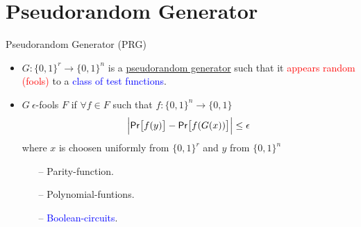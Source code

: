 \documentclass[xcolor={table,dvipsnames,usenames}]{beamer}
\begin{document}
\section{Pseudorandom Generator}
\begin{frame}{Pseudorandom Generator (PRG)}
\begin{itemize}
	\item $G: \{0,1\}^r \rightarrow \{0,1\}^n$ is a {\underline{pseudorandom generator}} such that it \textcolor{red}{appears random (fools)} to a \textcolor{blue}{class of test functions}.
	\pause
	\item $G~\epsilon$-fools $F$ if $\forall f \in F$ such that $f: \{0,1\}^n \rightarrow \{0,1\}$
	$$\Big|\mathsf{Pr}\big[f(y)\big] -  \mathsf{Pr}\big[f(G(x))\big]\Big| \leq \epsilon$$
	where $x$ is choosen uniformly from $\{0,1\}^r$ and $y$ from $\{0,1\}^n$
	\pause
	\begin{itemize}
		\item[--] Parity-function.
		\item[--] Polynomial-funtions.
		\item[--] \textcolor{blue}{Boolean-circuits}.
	\end{itemize}
\end{itemize}
\end{frame} 
\end{document}
